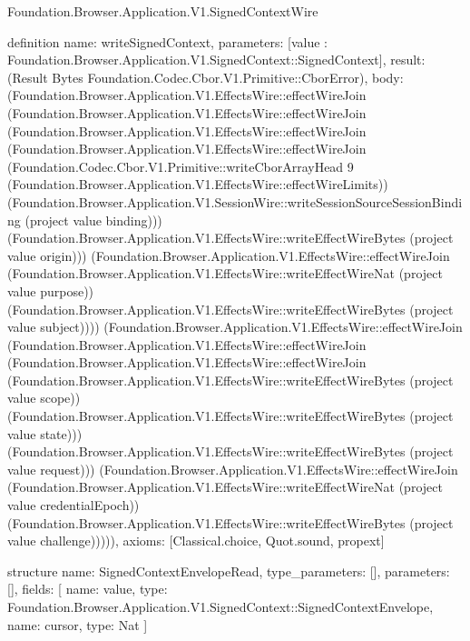 \begin{lexlean}{Foundation.Browser.Application.V1.SignedContextWire}
\begin{semanticmodule}
definition{
  name: writeSignedContext,
  parameters: [value : Foundation.Browser.Application.V1.SignedContext::SignedContext],
  result: (Result Bytes Foundation.Codec.Cbor.V1.Primitive::CborError),
  body: (Foundation.Browser.Application.V1.EffectsWire::effectWireJoin (Foundation.Browser.Application.V1.EffectsWire::effectWireJoin (Foundation.Browser.Application.V1.EffectsWire::effectWireJoin (Foundation.Browser.Application.V1.EffectsWire::effectWireJoin (Foundation.Codec.Cbor.V1.Primitive::writeCborArrayHead 9 (Foundation.Browser.Application.V1.EffectsWire::effectWireLimits)) (Foundation.Browser.Application.V1.SessionWire::writeSessionSourceSessionBinding (project value binding))) (Foundation.Browser.Application.V1.EffectsWire::writeEffectWireBytes (project value origin))) (Foundation.Browser.Application.V1.EffectsWire::effectWireJoin (Foundation.Browser.Application.V1.EffectsWire::writeEffectWireNat (project value purpose)) (Foundation.Browser.Application.V1.EffectsWire::writeEffectWireBytes (project value subject)))) (Foundation.Browser.Application.V1.EffectsWire::effectWireJoin (Foundation.Browser.Application.V1.EffectsWire::effectWireJoin (Foundation.Browser.Application.V1.EffectsWire::effectWireJoin (Foundation.Browser.Application.V1.EffectsWire::writeEffectWireBytes (project value scope)) (Foundation.Browser.Application.V1.EffectsWire::writeEffectWireBytes (project value state))) (Foundation.Browser.Application.V1.EffectsWire::writeEffectWireBytes (project value request))) (Foundation.Browser.Application.V1.EffectsWire::effectWireJoin (Foundation.Browser.Application.V1.EffectsWire::writeEffectWireNat (project value credentialEpoch)) (Foundation.Browser.Application.V1.EffectsWire::writeEffectWireBytes (project value challenge))))),
  axioms: [Classical.choice, Quot.sound, propext]
}

structure{
  name: SignedContextEnvelopeRead,
  type_parameters: [],
  parameters: [],
  fields: [
    {name: value, type: Foundation.Browser.Application.V1.SignedContext::SignedContextEnvelope},
    {name: cursor, type: Nat}
  ]
}


\end{semanticmodule}
\end{lexlean}
